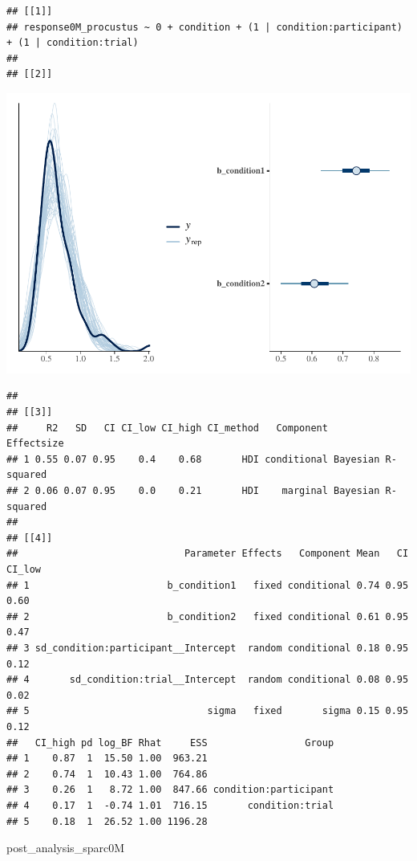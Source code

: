 \documentclass[
]{article}
\newenvironment{Shaded}{\begin{snugshade}}{\end{snugshade}}
\newcommand{\NormalTok}[1]{#1}
\begin{document}
\begin{verbatim}
## [[1]]
## response0M_procustus ~ 0 + condition + (1 | condition:participant) + (1 | condition:trial) 
## 
## [[2]]
\end{verbatim}

\includegraphics{06_Publish_GUSO_ASIL_files/figure-latex/Diagnostiics0M-1.pdf}

\begin{verbatim}
## 
## [[3]]
##     R2   SD   CI CI_low CI_high CI_method   Component         Effectsize
## 1 0.55 0.07 0.95    0.4    0.68       HDI conditional Bayesian R-squared
## 2 0.06 0.07 0.95    0.0    0.21       HDI    marginal Bayesian R-squared
## 
## [[4]]
##                             Parameter Effects   Component Mean   CI CI_low
## 1                        b_condition1   fixed conditional 0.74 0.95   0.60
## 2                        b_condition2   fixed conditional 0.61 0.95   0.47
## 3 sd_condition:participant__Intercept  random conditional 0.18 0.95   0.12
## 4       sd_condition:trial__Intercept  random conditional 0.08 0.95   0.02
## 5                               sigma   fixed       sigma 0.15 0.95   0.12
##   CI_high pd log_BF Rhat     ESS                 Group
## 1    0.87  1  15.50 1.00  963.21                      
## 2    0.74  1  10.43 1.00  764.86                      
## 3    0.26  1   8.72 1.00  847.66 condition:participant
## 4    0.17  1  -0.74 1.01  716.15       condition:trial
## 5    0.18  1  26.52 1.00 1196.28
\end{verbatim}

\begin{Shaded}
\begin{Highlighting}[]
\NormalTok{post\_analysis\_sparc0M}
\end{Highlighting}
\end{Shaded}
\end{document}
